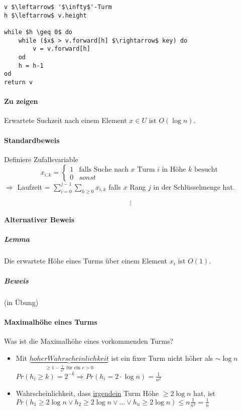 

\begin{lstlisting}[mathescape]
v $\leftarrow$ '$\infty$'-Turm
h $\leftarrow$ v.height

while $h \geq 0$ do
	while ($x$ > v.forward[h] $\rightarrow$ key) do
		v = v.forward[h]
	od
	h = h-1
od
return v
\end{lstlisting}

\paragraph*{Zu zeigen} Erwartete Suchzeit nach einem Element $x \in U$ ist $O(\log n)$.

\paragraph*{Standardbeweis} Definiere Zufallsvariable
\begin{equation}
   x_{i,k} = 
   \begin{cases}
     1 & \text{falls Suche nach } x \text{ Turm } i \text{ in Höhe } k \text{ besucht} \\
     0 & sonst
   \end{cases}
\end{equation}
$\Rightarrow$ Laufzeit = $\sum\limits_{i=0}^{j-1} \sum\limits_{h \geq 0} x_{i,k}$ falls $x$ Rang $j$ in der Schlüsselmenge hat.

$$\vdots$$

\paragraph*{Alternativer Beweis}
\subparagraph*{Lemma} Die erwartete Höhe eines Turms über einem Element $x_i$ ist $O(1)$.
\subparagraph*{Beweis} (in Übung)

\paragraph*{Maximalhöhe eines Turms} Was ist die Maximalhöhe eines vorkommenden Turms?
\begin{itemize}
	\item Mit $\underbrace{hoher Wahrscheinlichkeit}_{\geq 1 - \frac{1}{n^2} \text{ für ein } c>0}$
	ist ein fixer Turm nicht höher als $\sim \log n$
	$Pr(h_i \geq k) = 2^{-k} \Rightarrow Pr(h_i = 2 \cdot \log n) = \frac{1}{n^2}$
	\item Wahrscheinlichkeit, dass \underline{irgendein} Turm Höhe $\geq 2 \log n$ hat, ist $Pr(h_1 \geq 2 \log n \lor h_2 \geq 2 \log n \lor \dots \lor h_n \geq 2 \log n) \leq n \frac{1}{n^2} = \frac{1}{n}$
\end{itemize}

